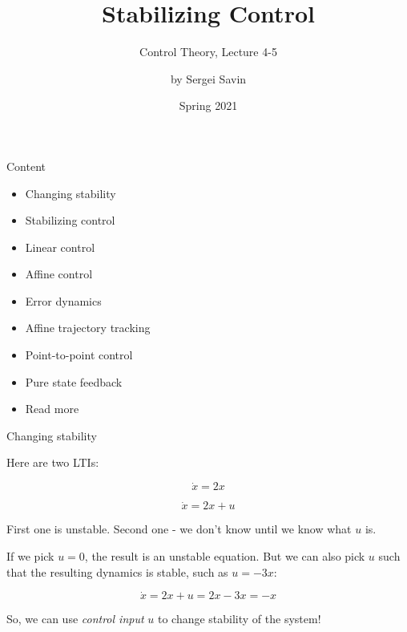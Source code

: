 \documentclass{beamer}
\title{Stabilizing Control}
\subtitle{Control Theory, Lecture 4-5}
\author{by Sergei Savin}
\date{Spring 2021}
\begin{document}
\maketitle


\begin{frame}{Content}

\begin{itemize}
\item Changing stability
\item Stabilizing control
\item Linear control
\item Affine control
\item Error dynamics
\item Affine trajectory tracking
\item Point-to-point control
\item Pure state feedback
\item Read more
\end{itemize}

\end{frame}



\begin{frame}{Changing stability}
\begin{flushleft}

Here are two LTIs:

\begin{equation}
    \dot{x} = 2 x
\end{equation}

\begin{equation}
    \dot{x} = 2 x + u
\end{equation}

First one is unstable. Second one - we don't know until we know what $u$ is.

\bigskip

If we pick $u=0$, the result is an unstable equation. But we can also pick $u$ such that the resulting dynamics is stable, such as $u=-3x$:

\begin{equation}
    \dot{x} = 2 x + u = 2 x - 3x = -x
\end{equation}

\begin{block}{ }
So, we can use \emph{control input} $u$ to change stability of the system!
\end{block}


\end{flushleft}
\end{frame}
\end{document}
